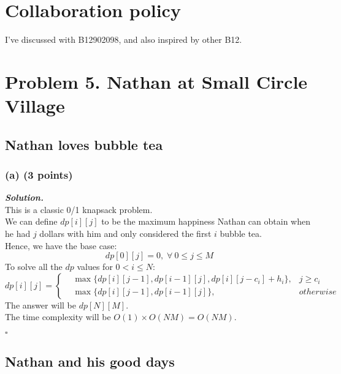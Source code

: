 \documentclass[12pt, a4paper, UTF8]{article}
\newenvironment{solution}[1][\it{Solution}]{\textbf{#1. }\\}{\begin{flushright}$\square$\end{flushright}}
\begin{document}
\pagestyle{fancy}
\fancyhead{} %
\fancyfoot{} %
\fancyfoot[C]{\thepage}
\section*{Collaboration policy}
    I've discussed with B12902098, and also inspired by other B12.
    \pagebreak
\section*{Problem 5. Nathan at Small Circle Village}
    \subsection*{Nathan loves bubble tea}
        \subsubsection*{(a) (3 points)}
            \begin{solution}
                This is a classic 0/1 knapsack problem.\\
                We can define $dp[i][j]$ to be the maximum happiness Nathan can obtain when he had $j$ dollars with him and only considered the first $i$ bubble tea. \\
                Hence, we have the base case:\\
                $$dp[0][j] = 0,\;\forall\ 0 \le j \le M$$
                To solve all the $dp$ values for $0 < i \le N$:
                $$dp[i][j] = \left\{\begin{split}
                    &\max\{dp[i][j - 1], dp[i - 1][j], dp[i][j - c_i] + h_i\}, &j \ge c_i\\
                    &\max\{dp[i][j - 1], dp[i - 1][j]\}, &otherwise
                \end{split}\right.$$
                The answer will be $dp[N][M]$.\\
                The time complexity will be $O(1) \times O(NM) = O(NM)$.
            \end{solution}
    \subsection*{Nathan and his good days}
\end{document}
